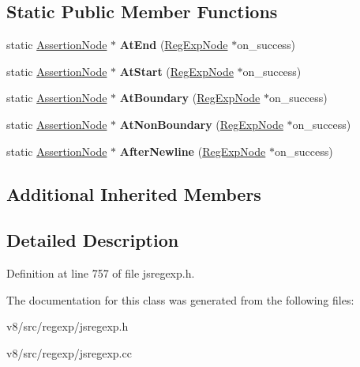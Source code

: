 \subsection*{Static Public Member Functions}
\begin{DoxyCompactItemize}
\item 
\mbox{\label{classv8_1_1internal_1_1AssertionNode_a7663a6a9a51975492c0bfe7b5a61a832}} 
static \mbox{\hyperlink{classv8_1_1internal_1_1AssertionNode}{Assertion\+Node}} $\ast$ {\bfseries At\+End} (\mbox{\hyperlink{classv8_1_1internal_1_1RegExpNode}{Reg\+Exp\+Node}} $\ast$on\+\_\+success)
\item 
\mbox{\label{classv8_1_1internal_1_1AssertionNode_ac3c21366bba17cf86759c0cdea7ae035}} 
static \mbox{\hyperlink{classv8_1_1internal_1_1AssertionNode}{Assertion\+Node}} $\ast$ {\bfseries At\+Start} (\mbox{\hyperlink{classv8_1_1internal_1_1RegExpNode}{Reg\+Exp\+Node}} $\ast$on\+\_\+success)
\item 
\mbox{\label{classv8_1_1internal_1_1AssertionNode_ac281096ab369662a023267aac4117bfd}} 
static \mbox{\hyperlink{classv8_1_1internal_1_1AssertionNode}{Assertion\+Node}} $\ast$ {\bfseries At\+Boundary} (\mbox{\hyperlink{classv8_1_1internal_1_1RegExpNode}{Reg\+Exp\+Node}} $\ast$on\+\_\+success)
\item 
\mbox{\label{classv8_1_1internal_1_1AssertionNode_ad6d20cd648da9b791ca9f35367f2470e}} 
static \mbox{\hyperlink{classv8_1_1internal_1_1AssertionNode}{Assertion\+Node}} $\ast$ {\bfseries At\+Non\+Boundary} (\mbox{\hyperlink{classv8_1_1internal_1_1RegExpNode}{Reg\+Exp\+Node}} $\ast$on\+\_\+success)
\item 
\mbox{\label{classv8_1_1internal_1_1AssertionNode_aa84ccd02ac323be278e3cb07633793b0}} 
static \mbox{\hyperlink{classv8_1_1internal_1_1AssertionNode}{Assertion\+Node}} $\ast$ {\bfseries After\+Newline} (\mbox{\hyperlink{classv8_1_1internal_1_1RegExpNode}{Reg\+Exp\+Node}} $\ast$on\+\_\+success)
\end{DoxyCompactItemize}
\subsection*{Additional Inherited Members}


\subsection{Detailed Description}


Definition at line 757 of file jsregexp.\+h.



The documentation for this class was generated from the following files\+:\begin{DoxyCompactItemize}
\item 
v8/src/regexp/jsregexp.\+h\item 
v8/src/regexp/jsregexp.\+cc\end{DoxyCompactItemize}
